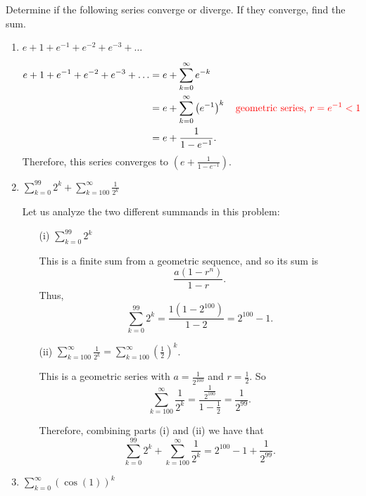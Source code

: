 \documentclass[]{ximera}
\begin{document}
\begin{problem}
Determine if the following series converge or diverge.  If they converge, find the sum.
	\begin{enumerate}
	
	\item  $e + 1 + e^{-1} + e^{-2} + e^{-3} + \hdots$
	\begin{freeResponse}
		\begin{align*}
		e + 1 + e^{-1} + e^{-2} + e^{-3} + \hdots
		&= e + \sum_{k = 0}^\infty e^{-k}  \\
		&= e + \sum_{k=0}^\infty \left( e^{-1} \right)^k 	\quad	{\color{red}\text{geometric series, }r = e^{-1} < 1}  \\
		&= e + \frac{1}{1-e^{-1}}.
		\end{align*}
	Therefore, this series converges to $\left( e + \frac{1}{1-e^{-1}} \right)$.  
	\end{freeResponse}
	
	
	
	\item  $\sum_{k=0}^{99} 2^k + \sum_{k=100}^\infty \frac{1}{2^k}$
	\begin{freeResponse}
	Let us analyze the two different summands in this problem:
		\begin{enumerate}
		\item[(i)]  $\sum_{k=0}^{99} 2^k$
		
		This is a finite sum from a geometric sequence, and so its sum is 
			\[
			\frac{a(1-r^n)}{1-r}.
			\]
		Thus,
	  		\[
	  		\sum_{k=0}^{99} 2^k = \frac{1(1-2^{100})}{1-2} = 2^{100} - 1.
	  		\]
	  		
		\item[(ii)]  $\sum_{k=100}^\infty \frac{1}{2^k} = \sum_{k=100}^\infty \left( \frac{1}{2} \right)^k$.  
		
		This is a geometric series with $a=\frac{1}{2^{100}}$ and $r = \frac{1}{2}$.  
		So
			\[
			\sum_{k=100}^\infty \frac{1}{2^k} = \frac{\frac{1}{2^{100}}}{1-\frac{1}{2}} = \frac{1}{2^{99}}.
			\]
			
	Therefore, combining parts (i) and (ii) we have that
		\[
		\sum_{k=0}^{99} 2^k + \sum_{k=100}^\infty \frac{1}{2^k} = 2^{100} - 1 + \frac{1}{2^{99}}.
		\]
		\end{enumerate}
	\end{freeResponse}
	
	
	
	\item  $\sum_{k=0}^\infty (\cos(1))^k$
	\begin{freeResponse}
	

\end{freeResponse}
\end{enumerate}
\end{problem}
\end{document}

